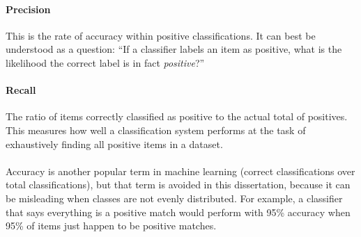 \paragraph{Precision} This is the rate of accuracy within positive
classifications.  It can best be understood as a question: ``If
a classifier labels an item as positive, what is the likelihood
the correct label is in fact {\it positive}?''
\paragraph{Recall} The ratio of items correctly classified as positive
to the actual total of positives.  This measures how well a
classification system performs at the task of exhaustively finding
all positive items in a dataset.
\\\\
\noindent Accuracy is another popular term in machine learning (correct
classifications over total classifications), but that term is avoided
in this dissertation, because it can be misleading when classes are
not evenly distributed.  For example, a classifier that says
everything is a positive match would perform with 95\% accuracy
when 95\% of items just happen to be positive matches.